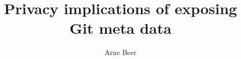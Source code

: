 %
%

\usepackage{lipsum}
\usepackage[utf8]{inputenc}
\usepackage[ngerman,english]{babel}
\usepackage{amsmath}
\usepackage{amsthm}
\usepackage{graphicx}
\usepackage{caption}
\usepackage[x11names]{xcolor}
\usepackage{lmodern}
\usepackage{float}
\usepackage{sidecap}
\usepackage{pgfplots}
\usepackage{pgfplotstable}
\usepackage{tabularcalc}
\usepackage{todonotes}
\usepackage{hyperref}
\usepackage{minted}
\usepackage{siunitx}
\usepackage{acronym}
\usepackage{subfig}
\usepackage{tabularx}
\usepackage{setspace}
\usepackage[customcolors]{hf-tikz}
\usepackage{url}
\usepackage{csquotes}
\usepackage{booktabs}
\usepackage[T1]{fontenc}
\usepackage[alldates=long]{biblatex}

\graphicspath{{images/}}
\pgfplotsset{compat=1.12}


\title{Privacy implications of exposing Git meta data}
\author{Arne Beer}




\thispagestyle{empty}

